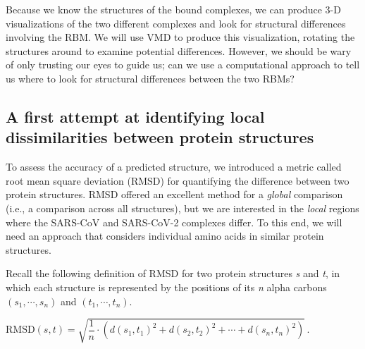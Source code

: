 \begin{note}\end{note}

Because we know the structures of the bound complexes, we can produce 3-D visualizations of the two different complexes and look for structural differences involving the RBM. We will use VMD to produce this visualization, rotating the structures around to examine potential differences. However, we should be wary of only trusting our eyes to guide us; can we use a computational approach to tell us where to look for structural differences between the two RBMs?

\FloatBarrier
{}
\subsection{A first attempt at identifying local dissimilarities between protein structures}

To assess the accuracy of a predicted structure, we introduced a metric called root mean square deviation (RMSD) for quantifying the difference between two protein structures. RMSD offered an excellent method for a \textit{global} comparison (i.e., a comparison across all structures), but we are interested in the \textit{local} regions where the SARS-CoV and SARS-CoV-2 complexes differ. To this end, we will need an approach that considers individual amino acids in similar protein structures.\\

\begin{qbox}\end{qbox}

Recall the following definition of RMSD for two protein structures \textit{s} and \textit{t}, in which each structure is represented by the positions of its \textit{n} alpha carbons $(s_{1}, \cdots, s_{n})$ and $(t_{1}, \cdots, t_{n})$.

\begin{center}
$\text{RMSD}(s, t) = \sqrt{\dfrac{1}{n} \cdot (d(s_1, t_1)^2 + d(s_2, t_2)^2 + \cdots + d(s_n, t_n)^2)}\,.$
\end{center}

